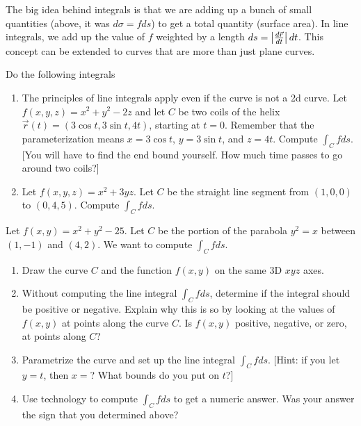 The big idea behind integrals is that we are adding up a bunch of small quantities (above, it was $d\sigma=fds$) to get a total quantity (surface area).  In line integrals, we add up the value of $f$ weighted by a length $ds=\left|\frac{d\vec r}{dt}\right|dt$.  This concept can be extended to curves that are more than just plane curves.
\begin{problem} Do the following integrals
\begin{enumerate}
\item The principles of line integrals apply even if the curve is not a 2d curve.  
  Let $f(x,y,z)=x^2+y^2-2z$ and let $C$ be two coils of the helix $\vec r(t)=(3\cos t, 3\sin t, 4t)$, starting at $t=0$. Remember that the parameterization means $x=3\cos t$, $y=3\sin t$, and $z=4t$.  Compute $\int_Cf ds$. [You will have to find the end bound yourself. How much time passes to go around two coils?]
\item {}%
 Let $f(x,y,z)=x^2+3yz$. Let $C$ be the straight line segment from $(1,0,0)$ to $(0,4,5)$. Compute $\int_C f ds$. 
\end{enumerate}
\end{problem}

\begin{problem}%
%
%
 Let $f(x,y)=x^2+y^2-25$. Let $C$ be the portion of the parabola $y^2=x$ between $(1,-1)$ and $(4,2)$. We want to compute $\int_C fds$.  
\begin{enumerate}
\item Draw the curve $C$ and the function $f(x,y)$ on the same 3D $xyz$ axes.
\item Without computing the line integral $\int_C fds$, determine if the integral should be positive or negative. Explain why this is so by looking at the values of $f(x,y)$ at points along the curve $C$.  Is $f(x,y)$ positive, negative, or zero, at points along $C$?
 \item Parametrize the curve and set up the line integral $\int_C f ds$. [Hint: if you let $y=t$, then $x=$? What bounds do you put on $t$?]
 \item Use technology to compute $\int_C fds$ to get a numeric answer.  Was your answer the sign that you determined above?
\end{enumerate}
\end{problem}

